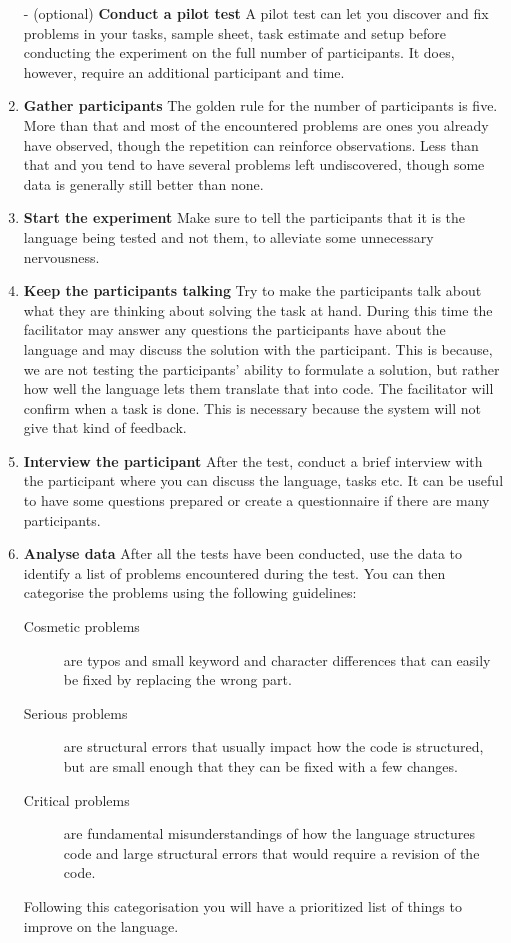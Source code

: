 \documentclass[preprint,10pt]{sigplanconf}
\begin{document}
\begin{enumerate}
\item[-] (optional) \textbf{Conduct a pilot test} A pilot test can let you discover and fix problems in your tasks, sample sheet, task estimate and setup before conducting the experiment on the full number of participants. It does, however, require an additional participant and time.
\item \textbf{Gather participants} The golden rule for the number of participants is five. More than that and most of the encountered problems are ones you already have observed, though the repetition can reinforce observations. Less than that and you tend to have several problems left undiscovered, though some data is generally still better than none.
\item \textbf{Start the experiment} Make sure to tell the participants that it is the language being tested and not them, to alleviate some unnecessary nervousness.
\item \textbf{Keep the participants talking} Try to make the participants talk about what they are thinking about solving the task at hand. During this time the facilitator may answer any questions the participants have about the language and may discuss the solution with the participant. This is because, we are not testing the participants' ability to formulate a solution, but rather how well the language lets them translate that into code. The facilitator will confirm when a task is done. This is necessary because the system will not give that kind of feedback.
\item \textbf{Interview the participant} After the test, conduct a brief interview with the participant where you can discuss the language, tasks etc. It can be useful to have some questions prepared or create a questionnaire if there are many participants.
\item \textbf{Analyse data} After all the tests have been conducted, use the data to identify a list of problems encountered during the test. You can then categorise the problems using the following guidelines:
\begin{description}
\item[Cosmetic problems] are typos and small keyword and character differences that can easily be fixed by replacing the wrong part.
\item[Serious problems] are structural errors that usually impact how the code is structured, but are small enough that they can be fixed with a few changes.
\item[Critical problems] are fundamental misunderstandings of how the language structures code and large structural errors that would require a revision of the code.
\end{description}
Following this categorisation you will have a prioritized list of things to improve on the language.
\end{enumerate}
\end{document}
